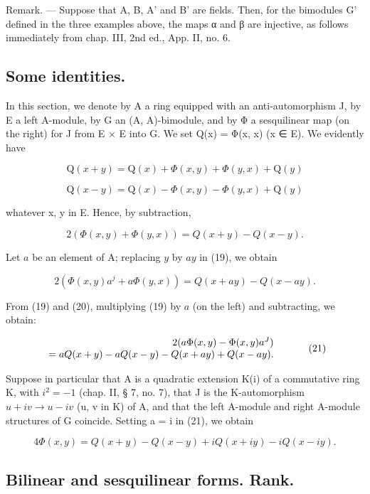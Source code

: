 Remark. --- Suppose that A, B, A' and B' are fields. Then, for the bimodules G' defined in the three examples above, the maps α and β are injective, as follows immediately from chap. III, 2nd ed., App. II, no. 6.

\subsection{Some identities.}

In this section, we denote by A a ring equipped with an anti-automorphism J, by E a left A-module, by G an (A, A)-bimodule, and by Φ a sesquilinear map (on the right) for J from E × E into G. We set Q(x) = Φ(x, x) (x ∈ E). We evidently have

\[
\mathrm{Q} (x + y) = \mathrm{Q} (x) + \Phi (x, y) + \Phi (y, x) + \mathrm{Q} (y)\tag{17}
\]

\[
\mathrm{Q} (x - y) = \mathrm{Q} (x) - \Phi (x, y) - \Phi (y, x) + \mathrm{Q} (y)\tag{18}
\]

whatever x, y in E. Hence, by subtraction,

\[
2 (\Phi (x, y) + \Phi (y, x)) = Q (x + y) - Q (x - y).\tag{19}
\]

Let \(a\) be an element of A; replacing \(y\) by \(ay\) in (19), we obtain

\[
2 (\Phi (x, y) a ^ {j} + a \Phi (y, x)) = Q (x + a y) - Q (x - a y).\tag{20}
\]

From (19) and (20), multiplying (19) by \(a\) (on the left) and subtracting, we obtain:

\[
\begin{array}{r l} 2 (a \Phi (x, y) - \Phi (x, y) a ^ {J}) & \\ = a Q (x + y) - a Q (x - y) - Q (x + a y) + Q (x - a y). \end{array}\tag{21}
\]

Suppose in particular that A is a quadratic extension K(i) of a commutative ring K, with \(i^{2} = -1\) (chap. II, § 7, no. 7), that J is the K-automorphism \(u + iv \rightarrow u - iv\) (u, v in K) of A, and that the left A-module and right A-module structures of G coincide. Setting a = i in (21), we obtain

\[
4 \Phi (x, y) = Q (x + y) - Q (x - y) + i Q (x + i y) - i Q (x - i y). \tag {22}
\]

\subsection{Bilinear and sesquilinear forms. Rank.}

